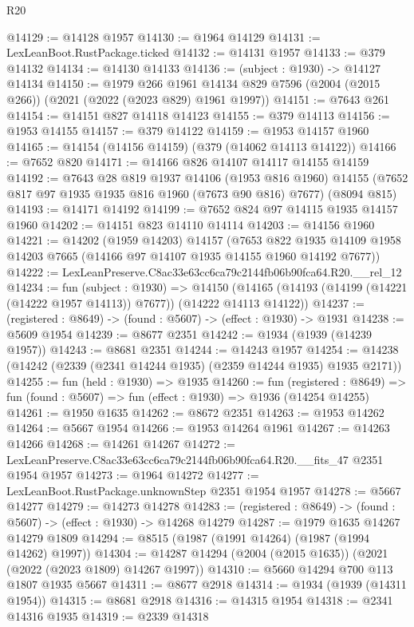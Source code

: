 \begin{lexlean}{R20}
\begin{coremodule}
@14129 := @14128 @1957
@14130 := @1964 @14129
@14131 := LexLeanBoot.RustPackage.ticked
@14132 := @14131 @1957
@14133 := @379 @14132
@14134 := @14130 @14133
@14136 := (subject : @1930) -> @14127 @14134
@14150 := @1979
    @266
    @1961
    @14134
    @829
    @7596
    (@2004 (@2015 @266))
    (@2021 (@2022 (@2023 @829) @1961 @1997))
@14151 := @7643 @261
@14154 := @14151 @827 @14118 @14123
@14155 := @379 @14113
@14156 := @1953 @14155
@14157 := @379 @14122
@14159 := @1953 @14157 @1960
@14165 := @14154 (@14156 @14159) (@379 (@14062 @14113 @14122))
@14166 := @7652 @820
@14171 := @14166 @826 @14107 @14117 @14155 @14159
@14192 := @7643
    @28
    @819
    @1937
    @14106
    (@1953 @816 @1960)
    @14155
    (@7652 @817 @97 @1935 @1935 @816 @1960 (@7673 @90 @816) @7677)
    (@8094 @815)
@14193 := @14171 @14192
@14199 := @7652 @824 @97 @14115 @1935 @14157 @1960
@14202 := @14151 @823 @14110 @14114
@14203 := @14156 @1960
@14221 := @14202
    (@1959 @14203)
    @14157
    (@7653 @822 @1935 @14109 @1958 @14203 @7665 (@14166 @97 @14107 @1935 @14155 @1960 @14192 @7677))
@14222 := LexLeanPreserve.C8ac33e63cc6ca79c2144fb06b90fca64.R20.__rel_12
@14234 := fun (subject : @1930) =>
  @14150 (@14165 (@14193 (@14199 (@14221 (@14222 @1957 @14113)) @7677)) (@14222 @14113 @14122))
@14237 := (registered : @8649) -> (found : @5607) -> (effect : @1930) -> @1931
@14238 := @5609 @1954
@14239 := @8677 @2351
@14242 := @1934 (@1939 (@14239 @1957))
@14243 := @8681 @2351
@14244 := @14243 @1957
@14254 := @14238 (@14242 (@2339 (@2341 @14244 @1935) (@2359 @14244 @1935) @1935 @2171))
@14255 := fun (held : @1930) => @1935
@14260 := fun (registered : @8649) =>
  fun (found : @5607) => fun (effect : @1930) => @1936 (@14254 @14255)
@14261 := @1950 @1635
@14262 := @8672 @2351
@14263 := @1953 @14262
@14264 := @5667 @1954
@14266 := @1953 @14264 @1961
@14267 := @14263 @14266
@14268 := @14261 @14267
@14272 := LexLeanPreserve.C8ac33e63cc6ca79c2144fb06b90fca64.R20.__fits_47 @2351 @1954 @1957
@14273 := @1964 @14272
@14277 := LexLeanBoot.RustPackage.unknownStep @2351 @1954 @1957
@14278 := @5667 @14277
@14279 := @14273 @14278
@14283 := (registered : @8649) -> (found : @5607) -> (effect : @1930) -> @14268 @14279
@14287 := @1979 @1635 @14267 @14279 @1809
@14294 := @8515 (@1987 (@1991 @14264) (@1987 (@1994 @14262) @1997))
@14304 := @14287 @14294 (@2004 (@2015 @1635)) (@2021 (@2022 (@2023 @1809) @14267 @1997))
@14310 := @5660 @14294 @700 @113 @1807 @1935 @5667
@14311 := @8677 @2918
@14314 := @1934 (@1939 (@14311 @1954))
@14315 := @8681 @2918
@14316 := @14315 @1954
@14318 := @2341 @14316 @1935
@14319 := @2339 @14318

\end{coremodule}
\end{lexlean}
